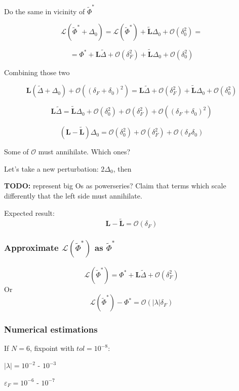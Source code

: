 \documentclass[a4paper,12pt]{article}
\newcommand{\wt}{\widetilde} %
\newcommand{\FP}{\Phi^*}%
\newcommand{\D}{\Delta}%
\newcommand{\Lmap}{\mathcal{L}} %
\newcommand{\Lmat}{\mathbf{L}}  %
\begin{document}
Do the same in vicinity of $\wt \FP$

$$
\mathcal{L}(\wt \FP + \D_0)
= \mathcal{L}(\wt \FP) +  \wt{\mathbf{L}} \D_0 + \mathcal{O}(\delta_0^2) =
$$

$$
=  \FP + \Lmat \wt \D + \mathcal{O}(\delta_F^2)  +  \wt{\mathbf{L}} \D_0 + \mathcal{O}(\delta_0^2)
$$%


Combining those two

$$
\mathbf{L}  ( \wt \D +  \D_0 ) + \mathcal{O}(( \delta_F + \delta_0)^2)
=
\Lmat \wt \D + \mathcal{O}(\delta_F^2)  +  \wt{\mathbf{L}} \D_0 + \mathcal{O}(\delta_0^2)
$$


$$
\mathbf{L} \wt \D 
=
 \wt{\mathbf{L}} \D_0 + \mathcal{O}(\delta_0^2) + \mathcal{O}(\delta_F^2) + \mathcal{O}(( \delta_F + \delta_0)^2)
$$

$$
(\mathbf{L} -  \wt{\mathbf{L}}) \D_0 
=
\mathcal{O}(\delta_0^2) + \mathcal{O}(\delta_F^2) + \mathcal{O}(\delta_F \delta_0)
$$

Some of $\mathcal{O}$ must annihilate. Which ones?

Let's take a new perturbation: $2 \D_0$, then 

\textbf{TODO:} represent big Os as powerseries? Claim that terms which scale differently that the left side must annihilate. 

Expected result:
$$
\mathbf{L} -  \wt{\mathbf{L}}
=
 \mathcal{O}(\delta_F)
$$

\subsubsection*{Approximate $\Lmap(\wt \FP)$ as $\wt \FP$}

\begin{equation}
\Lmap(\wt \FP) = \FP + \Lmat \wt \D + \mathcal{O}(\delta_F ^2)
\end{equation}
Or
\begin{equation}
\Lmap(\wt \FP) - \FP = \mathcal{O}(|\lambda| \delta_F)
\end{equation}


\subsubsection*{Numerical estimations}

If $N = 6$, fixpoint with $ tol  =10 ^{-8}$:

$|\lambda| = 10 ^ {-2}$ - $10 ^ {-3}$

$\varepsilon_F = 10 ^ {-6}$ - $10^{-7}$
\end{document}
